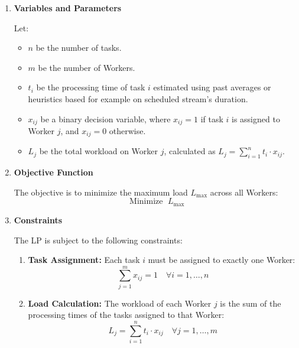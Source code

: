 \begin{enumerate}
    \item \textbf{Variables and Parameters}

Let:
\begin{itemize}
    \item \( n \) be the number of tasks.
    \item \( m \) be the number of Workers.
    \item \( t_i \) be the processing time of task \( i \) estimated using past averages or heuristics based for example on scheduled stream's duration.
    \item \( x_{ij} \) be a binary decision variable, where \( x_{ij} = 1 \) if task \( i \) is assigned to Worker \( j \), and \( x_{ij} = 0 \) otherwise.
    \item \( L_j \) be the total workload on Worker \( j \), calculated as \( L_j = \sum_{i=1}^{n} t_i \cdot x_{ij} \).
\end{itemize}

\item \textbf{Objective Function}

The objective is to minimize the maximum load \( L_{\mathrm{max}} \) across all Workers:
\begin{equation}
\operatorname{Minimize\ } L_{\text{max}}
\end{equation}

\item \textbf{Constraints}

The \ac{LP} is subject to the following constraints:

\begin{enumerate}
    \item \textbf{Task Assignment:} Each task \( i \) must be assigned to exactly one Worker:
    \begin{equation}
    \sum_{j=1}^{m} x_{ij} = 1 \quad \forall i = 1, \dots, n
    \end{equation}

    \item \textbf{Load Calculation:} The workload of each Worker \( j \) is the sum of the processing times of the tasks assigned to that Worker:
    \begin{equation}
    L_j = \sum_{i=1}^{n} t_i \cdot x_{ij} \quad \forall j = 1, \dots, m
    \end{equation}


\end{enumerate}
\end{enumerate}
